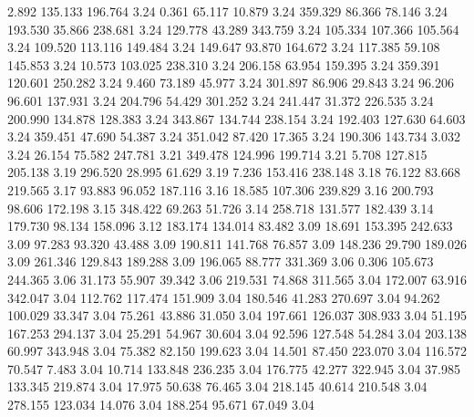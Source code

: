    2.892  135.133  196.764         3.24
   0.361   65.117   10.879         3.24
 359.329   86.366   78.146         3.24
 193.530   35.866  238.681         3.24
 129.778   43.289  343.759         3.24
 105.334  107.366  105.564         3.24
 109.520  113.116  149.484         3.24
 149.647   93.870  164.672         3.24
 117.385   59.108  145.853         3.24
  10.573  103.025  238.310         3.24
 206.158   63.954  159.395         3.24
 359.391  120.601  250.282         3.24
   9.460   73.189   45.977         3.24
 301.897   86.906   29.843         3.24
  96.206   96.601  137.931         3.24
 204.796   54.429  301.252         3.24
 241.447   31.372  226.535         3.24
 200.990  134.878  128.383         3.24
 343.867  134.744  238.154         3.24
 192.403  127.630   64.603         3.24
 359.451   47.690   54.387         3.24
 351.042   87.420   17.365         3.24
 190.306  143.734    3.032         3.24
  26.154   75.582  247.781         3.21
 349.478  124.996  199.714         3.21
   5.708  127.815  205.138         3.19
 296.520   28.995   61.629         3.19
   7.236  153.416  238.148         3.18
  76.122   83.668  219.565         3.17
  93.883   96.052  187.116         3.16
  18.585  107.306  239.829         3.16
 200.793   98.606  172.198         3.15
 348.422   69.263   51.726         3.14
 258.718  131.577  182.439         3.14
 179.730   98.134  158.096         3.12
 183.174  134.014   83.482         3.09
  18.691  153.395  242.633         3.09
  97.283   93.320   43.488         3.09
 190.811  141.768   76.857         3.09
 148.236   29.790  189.026         3.09
 261.346  129.843  189.288         3.09
 196.065   88.777  331.369         3.06
   0.306  105.673  244.365         3.06
  31.173   55.907   39.342         3.06
 219.531   74.868  311.565         3.04
 172.007   63.916  342.047         3.04
 112.762  117.474  151.909         3.04
 180.546   41.283  270.697         3.04
  94.262  100.029   33.347         3.04
  75.261   43.886   31.050         3.04
 197.661  126.037  308.933         3.04
  51.195  167.253  294.137         3.04
  25.291   54.967   30.604         3.04
  92.596  127.548   54.284         3.04
 203.138   60.997  343.948         3.04
  75.382   82.150  199.623         3.04
  14.501   87.450  223.070         3.04
 116.572   70.547    7.483         3.04
  10.714  133.848  236.235         3.04
 176.775   42.277  322.945         3.04
  37.985  133.345  219.874         3.04
  17.975   50.638   76.465         3.04
 218.145   40.614  210.548         3.04
 278.155  123.034   14.076         3.04
 188.254   95.671   67.049         3.04
